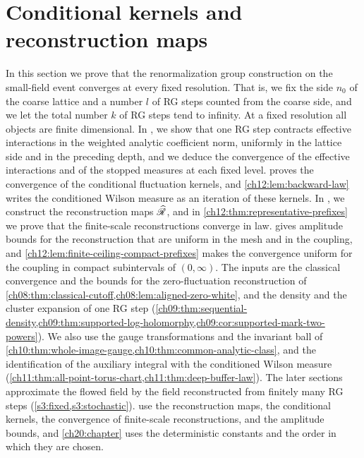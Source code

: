 \chapter{Conditional kernels and reconstruction maps}\label{ch12:chapter}

In this section we prove that the renormalization group construction on the small-field event converges at every fixed resolution. That is, we fix the side $n_0$ of the coarse lattice and a number $l$ of RG steps counted from the coarse side, and we let the total number $k$ of RG steps tend to infinity. At a fixed resolution all objects are finite dimensional. In , we show that one RG step contracts effective interactions in the weighted analytic coefficient norm, uniformly in the lattice side and in the preceding depth, and we deduce the convergence of the effective interactions and of the stopped measures at each fixed level.  proves the convergence of the conditional fluctuation kernels, and \cref{ch12:lem:backward-law} writes the conditioned Wilson measure as an iteration of these kernels. In , we construct the reconstruction maps $\widehat{\mathscr R}$, and in \cref{ch12:thm:representative-prefixes} we prove that the finite-scale reconstructions converge in law.  gives amplitude bounds for the reconstruction that are uniform in the mesh and in the coupling, and \cref{ch12:lem:finite-ceiling-compact-prefixes} makes the convergence uniform for the coupling in compact subintervals of $(0,\infty)$. The inputs are the classical convergence and the bounds for the zero-fluctuation reconstruction of \cref{ch08:thm:classical-cutoff,ch08:lem:aligned-zero-white}, and the density and the cluster expansion of one RG step (\cref{ch09:thm:sequential-density,ch09:thm:supported-log-holomorphy,ch09:cor:supported-mark-two-powers}). We also use the gauge transformations and the invariant ball of \cref{ch10:thm:whole-image-gauge,ch10:thm:common-analytic-class}, and the identification of the auxiliary integral with the conditioned Wilson measure (\cref{ch11:thm:all-point-torus-chart,ch11:thm:deep-buffer-law}). The later sections approximate the flowed field by the field reconstructed from finitely many RG steps (\cref{s3:fixed,s3:stochastic}).  use the reconstruction maps, the conditional kernels, the convergence of finite-scale reconstructions, and the amplitude bounds, and \cref{ch20:chapter} uses the deterministic constants and the order in which they are chosen.

